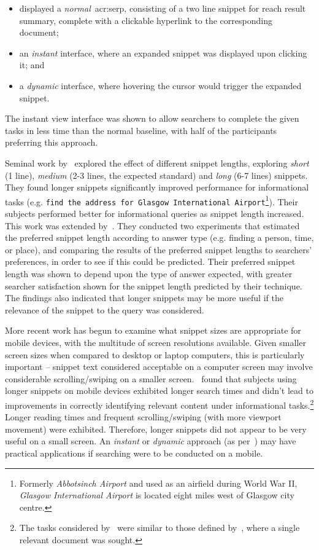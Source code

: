 \begin{itemize}
    \item{displayed a \emph{normal}~\gls{acr:serp}, consisting of a two line snippet for reach result summary, complete with a clickable hyperlink to the corresponding document;}
    \item{an \emph{instant} interface, where an expanded snippet was displayed upon clicking it; and}
    \item{a \emph{dynamic} interface, where hovering the cursor would trigger the expanded snippet.}
\end{itemize}

The instant view interface was shown to allow searchers to complete the given tasks in less time than the normal baseline, with half of the participants preferring this approach.

Seminal work by~\cite{cutrell2007eye_tracking} explored the effect of different snippet lengths, exploring \emph{short} (1 line), \emph{medium} (2-3 lines, the expected standard) and \emph{long} (6-7 lines) snippets. They found longer snippets significantly improved performance for informational tasks (e.g. \texttt{find the address for Glasgow International Airport}\footnote{Formerly \emph{Abbotsinch Airport} and used as an airfield during World War II, \emph{Glasgow International Airport} is located eight miles west of Glasgow city centre.}). Their subjects performed better for informational queries as snippet length increased. This work was extended by~\cite{kaisser2008improving}. They conducted two experiments that estimated the preferred snippet length according to answer type (e.g. finding a person, time, or place), and comparing the results of the preferred snippet lengths to searchers' preferences, in order to see if this could be predicted. Their preferred snippet length was shown to depend upon the type of answer expected, with greater searcher satisfaction shown for the snippet length predicted by their technique. The findings also indicated that longer snippets may be more useful if the relevance of the snippet to the query was considered.

More recent work has begun to examine what snippet sizes are appropriate for mobile devices, with the multitude of screen resolutions available. Given smaller screen sizes when compared to desktop or laptop computers, this is particularly important -- snippet text considered acceptable on a computer screen may involve considerable scrolling/swiping on a smaller screen.~\cite{kim2017mobile_search_snippets} found that subjects using longer snippets on mobile devices exhibited longer search times and didn't lead to improvements in correctly identifying relevant content under informational tasks.\footnote{The tasks considered by~\cite{kim2017mobile_search_snippets} were similar to those defined by~\cite{cutrell2007eye_tracking}, where a single relevant document was sought.} Longer reading times and frequent scrolling/swiping (with more viewport movement) were exhibited. Therefore, longer snippets did not appear to be very useful on a small screen. An \emph{instant} or \emph{dynamic} approach (as per~\cite{paek2004wavelens}) may have practical applications if searching were to be conducted on a mobile.


